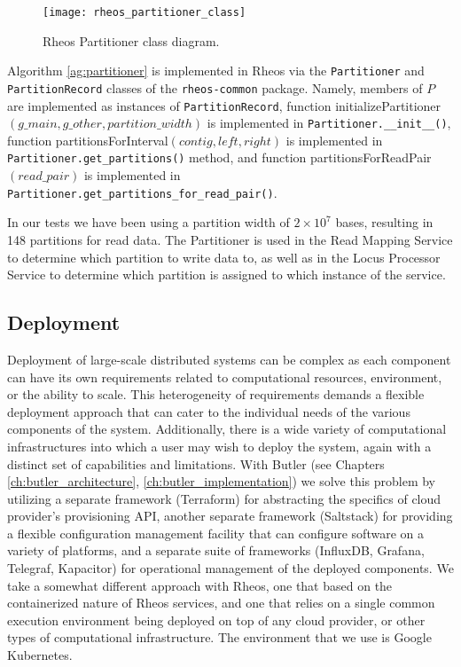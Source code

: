 \begin{figure}[h!]
    \texttt{[image: rheos\_partitioner\_class]}
    \centering
    \caption {Rheos Partitioner class diagram.}
    \label{fig:rheos_partitioner_class}
\end{figure}

Algorithm \ref{ag:partitioner} is implemented in Rheos via the \texttt{Partitioner} and \texttt{PartitionRecord} classes of the \texttt{rheos-common} package. Namely, members of $P$ are implemented as instances of \texttt{PartitionRecord}, function {\sc initializePartitioner}$(g\_main, g\_other, partition\_width)$ is implemented in \texttt{Partitioner.__init__()}, function {\sc partitionsForInterval}$(contig, left, right)$ is implemented in \texttt{Partitioner.get_partitions()} method, and function {\sc partitionsForReadPair}$(read\_pair)$ is implemented in \texttt{Partitioner.get_partitions_for_read_pair()}.

In our tests we have been using a partition width of $2\times10^7$ bases, resulting in 148 partitions for read data. The Partitioner is used in the Read Mapping Service to determine which partition to write data to, as well as in the Locus Processor Service to determine which partition is assigned to which instance of the service.

\subsection{Deployment}

Deployment of large-scale distributed systems can be complex as each component can have its own requirements related to computational resources, environment, or the ability to scale. This heterogeneity of requirements demands a flexible deployment approach that can cater to the individual needs of the various components of the system. Additionally, there is a wide variety of computational infrastructures into which a user may wish to deploy the system, again with a distinct set of capabilities and limitations. With Butler (see Chapters \ref{ch:butler_architecture}, \ref{ch:butler_implementation}) we solve this problem by utilizing a separate framework (Terraform) for abstracting the specifics of cloud provider's provisioning API, another separate framework (Saltstack) for providing a flexible configuration management facility that can configure software on a variety of platforms, and a separate suite of frameworks (InfluxDB, Grafana, Telegraf, Kapacitor) for operational management of the deployed components. We take a somewhat different approach with Rheos, one that based on the containerized nature of Rheos services, and one that relies on a single common execution environment being deployed on top of any cloud provider, or other types of computational infrastructure. The environment that we use is Google Kubernetes\autocite{bernstein2014containers}. 

